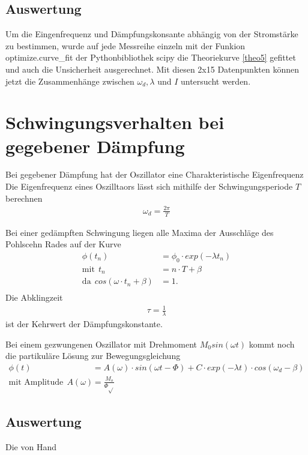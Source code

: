 \documentclass[11pt, a4paper]{article}
\begin{document}
    \subsection{Auswertung}
    Um die Eingenfrequenz und Dämpfungskonsante abhängig von der Stromstärke zu bestimmen,
    wurde auf jede Messreihe einzeln mit
    der Funkion \textsf{optimize.curve\_fit} der Pythonbibliothek scipy die Theoriekurve \ref{theo5}
    gefittet und auch die Unsicherheit ausgerechnet. Mit diesen 2x15 Datenpunkten können jetzt die Zusammenhänge
    zwischen $\omega_d, \lambda$ und $I$ untersucht werden.



    \section{Schwingungsverhalten bei gegebener Dämpfung}

    Bei gegebener Dämpfung hat der Oszillator eine Charakteristische Eigenfrequenz
    Die Eigenfrequenz eines Oszilltaors lässt sich mithilfe der Schwingungsperiode $T$ berechnen
    \begin{align}
        \omega_d = \frac{2\pi}{T}
    \end{align}

    Bei einer gedämpften Schwingung liegen alle Maxima der Ausschläge des Pohlscehn Rades auf der Kurve
    \begin{align}
        \phi(t_n) &= \phi_0 \cdot exp(-\lambda t_n) \\
        \text{mit} \ \ t_n &= n \cdot T + \beta \\
        \text{da} \ \ cos(\omega \cdot t_n + \beta) &= 1. \\
    \end{align}
    Die Abklingzeit
    \begin{align}
        \tau = \frac{1}{\lambda}
    \end{align}
    ist der Kehrwert der Dämpfungskonstante.

    Bei einem gezwungenen Oszillator mit Drehmoment $M_0 sin(\omega t)$ kommt noch die partikuläre Lösung zur Bewegungsgleichung
    \begin{align}
        \phi(t) &= A(\omega) \cdot sin(\omega t - \Phi) + C \cdot exp(-\lambda t) \cdot cos(\omega_d - \beta) \\
        \text{mit Amplitude}  \ \ A(\omega) &= \frac{M_o}{\Phi \sqrt{}}
    \end{align}

    \subsection{Auswertung}
    Die von Hand

    
    
\end{document}
